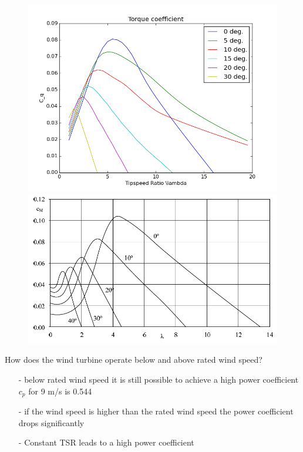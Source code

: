 \documentclass[12pt,t]{beamer}
\begin{document}
\begin{frame}
\begin{figure}[htbp]
        \begin{minipage}{0.4\linewidth}
            \includegraphics[width=\linewidth]{figures/torque.png}
        \end{minipage}
        \begin{minipage}{0.4\linewidth}
\includegraphics[width=\linewidth]{figures/torque_coeff_literature.png}
        \end{minipage}
\end{figure}
\end{frame}

\begin{frame}
How does the wind turbine operate below and above rated wind speed?\\
\begin{itemize}
\pause
\item[-] below rated wind speed it is still possible to achieve a high power coefficient $c_p$ for 9 m/s is 0.544
\pause
\item[-]if the wind speed is higher than the rated wind speed the power coefficient drops significantly
\pause
\item[-]Constant TSR leads to a high power coefficient
\end{itemize}
\end{frame} 
\end{document}
